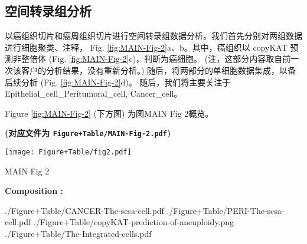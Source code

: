 \documentclass[
]{article}
\begin{document}
\begin{center}\vspace{1.5cm}\end{center}

\hypertarget{ux7a7aux95f4ux8f6cux5f55ux7ec4ux5206ux6790}{%
\subsection{空间转录组分析}\label{ux7a7aux95f4ux8f6cux5f55ux7ec4ux5206ux6790}}

以癌组织切片和癌周组织切片进行空间转录组数据分析。我们首先分别对两组数据进行细胞聚类、注释，
Fig. \ref{fig:MAIN-Fig-2}a、b。其中，癌组织以 copyKAT 预测非整倍体 (Fig. \ref{fig:MAIN-Fig-2}c)，判断为癌细胞。
(注，这部分内容取自前一次该客户的分析结果，没有重新分析。)
随后，将两部分的单细胞数据集成，以备后续分析 (Fig. \ref{fig:MAIN-Fig-2}d)。
随后，我们将主要关注于 Epithelial\_cell\_Peritumoral\_cell, Cancer\_cell。

\begin{center}\vspace{1.5cm}\end{center}

Figure \ref{fig:MAIN-Fig-2} (下方图) 为图MAIN Fig 2概览。

\textbf{(对应文件为 \texttt{Figure+Table/MAIN-Fig-2.pdf})}

\def\@captype{figure}
\begin{center}
\texttt{[image: Figure+Table/fig2.pdf]}
\caption{MAIN Fig 2}\label{fig:MAIN-Fig-2}
\end{center}
\begin{center}\begin{tcolorbox}[colback=gray!10, colframe=gray!50, width=0.9\linewidth, arc=1mm, boxrule=0.5pt]
\textbf{
Composition
:}

\vspace{0.5em}

    ./Figure+Table/CANCER-The-scsa-cell.pdf \newline
./Figure+Table/PERI-The-scsa-cell.pdf \newline
./Figure+Table/copyKAT-prediction-of-aneuploidy.png
\newline ./Figure+Table/The-Integrated-cells.pdf

\vspace{2em}
\end{tcolorbox}
\end{center}
\end{document}
